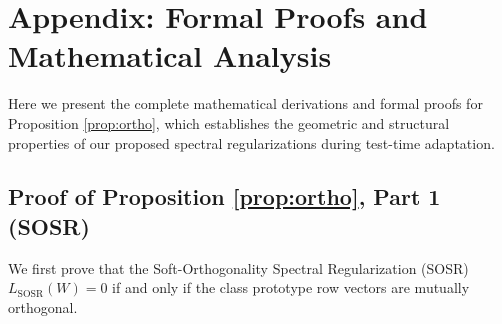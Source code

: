 \documentclass{article}
\theoremstyle{plain}
\theoremstyle{definition}
\theoremstyle{remark}
\begin{document}
\clearpage




\clearpage
\appendix
\onecolumn

\section{Appendix: Formal Proofs and Mathematical Analysis}
\label{appendix:proofs}

Here we present the complete mathematical derivations and formal proofs for Proposition \ref{prop:ortho}, which establishes the geometric and structural properties of our proposed spectral regularizations during test-time adaptation.

\subsection{Proof of Proposition \ref{prop:ortho}, Part 1 (SOSR)}
We first prove that the Soft-Orthogonality Spectral Regularization (SOSR) $L_{\text{SOSR}}(W) = 0$ if and only if the class prototype row vectors are mutually orthogonal.
\end{document}
